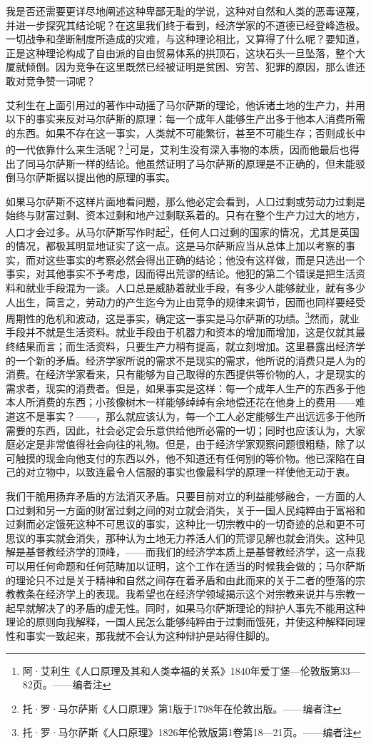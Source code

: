 \documentclass[a4paper,twoside,12pt]{ctexart}
\begin{document}
我是否还需要更详尽地阐述这种卑鄙无耻的学说，这种对自然和人类的恶毒诬蔑，并进一步探究其结论呢？在这里我们终于看到，经济学家的不道德已经登峰造极。一切战争和垄断制度所造成的灾难，与这种理论相比，又算得了什么呢？要知道，正是这种理论构成了自由派的自由贸易体系的拱顶石，这块石头一旦坠落，整个大厦就倾倒。因为竞争在这里既然已经被证明是贫困、穷苦、犯罪的原因，那么谁还敢对竞争赞一词呢？

艾利生在上面引用过的著作中动摇了马尔萨斯的理论，他诉诸土地的生产力，并用以下的事实来反对马尔萨斯的原理：每一个成年人能够生产出多于他本人消费所需的东西。如果不存在这一事实，人类就不可能繁衍，甚至不可能生存；否则成长中的一代依靠什么来生活呢？\footnote{阿·艾利生《人口原理及其和人类幸福的关系》1840年爱丁堡—伦敦版第33—82页。——编者注}可是，艾利生没有深入事物的本质，因而他最后也得出了同马尔萨斯一样的结论。他虽然证明了马尔萨斯的原理是不正确的，但未能驳倒马尔萨斯据以提出他的原理的事实。

如果马尔萨斯不这样片面地看问题，那么他必定会看到，人口过剩或劳动力过剩是始终与财富过剩、资本过剩和地产过剩联系着的。只有在整个生产力过大的地方，人口才会过多。从马尔萨斯写作时起\footnote{托·罗·马尔萨斯《人口原理》第1版于1798年在伦敦出版。——编者注}，任何人口过剩的国家的情况，尤其是英国的情况，都极其明显地证实了这一点。这是马尔萨斯应当从总体上加以考察的事实，而对这些事实的考察必然会得出正确的结论；他没有这样做，而是只选出一个事实，对其他事实不予考虑，因而得出荒谬的结论。他犯的第二个错误是把生活资料和就业手段混为一谈。人口总是威胁着就业手段，有多少人能够就业，就有多少人出生，简言之，劳动力的产生迄今为止由竞争的规律来调节，因而也同样要经受周期性的危机和波动，这是事实，确定这一事实是马尔萨斯的功绩。\footnote{托·罗·马尔萨斯《人口原理》1826年伦敦版第1卷第18—21页。——编者注}然而，就业手段并不就是生活资料。就业手段由于机器力和资本的增加而增加，这是仅就其最终结果而言；而生活资料，只要生产力稍有提高，就立刻增加。这里暴露出经济学的一个新的矛盾。经济学家所说的需求不是现实的需求，他所说的消费只是人为的消费。在经济学家看来，只有能够为自己取得的东西提供等价物的人，才是现实的需求者，现实的消费者。但是，如果事实是这样：每一个成年人生产的东西多于他本人所消费的东西；小孩像树木一样能够绰绰有余地偿还花在他身上的费用——难道这不是事实？——，那么就应该认为，每一个工人必定能够生产出远远多于他所需要的东西，因此，社会必定会乐意供给他所必需的一切；同时也应该认为，大家庭必定是非常值得社会向往的礼物。但是，由于经济学家观察问题很粗糙，除了以可触摸的现金向他支付的东西以外，他不知道还有任何别的等价物。他已深陷在自己的对立物中，以致连最令人信服的事实也像最科学的原理一样使他无动于衷。

我们干脆用扬弃矛盾的方法消灭矛盾。只要目前对立的利益能够融合，一方面的人口过剩和另一方面的财富过剩之间的对立就会消失，关于一国人民纯粹由于富裕和过剩而必定饿死这种不可思议的事实，这种比一切宗教中的一切奇迹的总和更不可思议的事实就会消失，那种认为土地无力养活人们的荒谬见解也就会消失。这种见解是基督教经济学的顶峰，——而我们的经济学本质上是基督教经济学，这一点我可以用任何命题和任何范畴加以证明，这个工作在适当的时候我会做的；马尔萨斯的理论只不过是关于精神和自然之间存在着矛盾和由此而来的关于二者的堕落的宗教教条在经济学上的表现。我希望也在经济学领域揭示这个对宗教来说并与宗教一起早就解决了的矛盾的虚无性。同时，如果马尔萨斯理论的辩护人事先不能用这种理论的原则向我解释，一国人民怎么能够纯粹由于过剩而饿死，并使这种解释同理性和事实一致起来，那我就不会认为这种辩护是站得住脚的。
\end{document}
